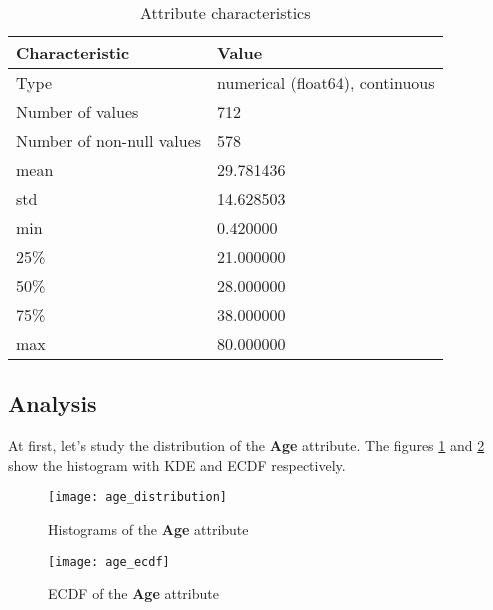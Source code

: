 \begin{table}[!ht]
    \centering
    \caption{Attribute characteristics}
    \begin{tabular}{|l|l|}
        \hline
        \textbf{Characteristic}   & \textbf{Value}                  \\ \hline
        Type                      & numerical (float64), continuous \\ \hline
        Number of values          & 712                             \\ \hline
        Number of non-null values & 578                             \\ \hline
        mean                      & 29.781436                       \\ \hline
        std                       & 14.628503                       \\ \hline
        min                       & 0.420000                        \\ \hline
        25\%                      & 21.000000                       \\ \hline
        50\%                      & 28.000000                       \\ \hline
        75\%                      & 38.000000                       \\ \hline
        max                       & 80.000000                       \\ \hline
    \end{tabular}
    \label{table:age_characteristics}
\end{table}

\subsection{Analysis}
At first, let's study the distribution of the \textbf{Age} attribute.
The figures \ref{pic:age_distribution} and \ref{pic:age_ecdf} show the 
histogram with KDE and ECDF respectively.

\begin{figure}[!ht]
    \centering
    \texttt{[image: age\_distribution]}
    \caption{Histograms of the \textbf{Age} attribute}
    \label{pic:age_distribution}
\end{figure}

\begin{figure}[!ht]
    \centering
    \texttt{[image: age\_ecdf]}
    \caption{ECDF of the \textbf{Age} attribute}
    \label{pic:age_ecdf}
\end{figure}

